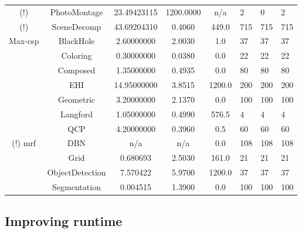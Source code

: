 \begin{table}
\begin{tabu}{ccS[round-mode=places,round-precision=3]
					  S[round-mode=places,round-precision=0]
					  S[round-mode=places,round-precision=0]HHH}
(!)				&	PhotoMontage	&	23.49423115	&	1200.0000	&	{n/a}	&	2	&	0	&	2 \\
(!)				&	SceneDecomp	&	43.69204310	&	0.4060	&	449.0	&	715	&	715	&	715 \\
			Max-\acrshort{csp}	&	BlackHole	&	2.60000000	&	2.0030	&	1.0	&	37	&	37	&	37 \\
				&	Coloring	&	0.30000000	&	0.0380	&	0.0	&	22	&	22	&	22 \\
	&	Composed	&	1.35000000	&	0.4935	&	0.0	&	80	&	80	&	80 \\
				&	EHI	&	14.95000000	&	3.8515	&	1200.0	&	200	&	200	&	200 \\
	&	Geometric	&	3.20000000	&	2.1370	&	0.0	&	100	&	100	&	100 \\
				&	Langford	&	1.05000000	&	0.4990	&	576.5	&	4	&	4	&	4 \\
	&	QCP	&	4.20000000	&	0.3960	&	0.5	&	60	&	60	&	60 \\
(!)			\acrshort{mrf}	&	DBN	&	{n/a}	&	{n/a}	&	0.0	&	108	&	108	&	108 \\
				&	Grid	&	0.680693	&	2.5030	&	161.0	&	21	&	21	&	21 \\
				&	ObjectDetection	&	7.570422	&	5.9700	&	1200.0	&	37	&	37	&	37 \\
				&	Segmentation	&	0.004515	&	1.3900	&	0.0	&	100	&	100	&	100 \\
		\bottomrule
	\end{tabu}
\end{table}

\subsection{Improving runtime}
